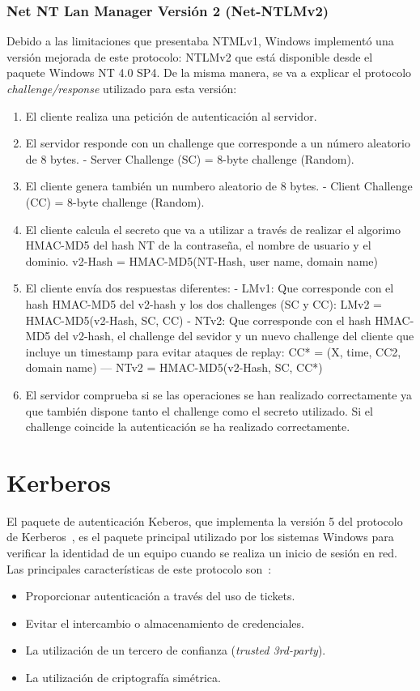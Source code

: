 \subsubsection{Net NT Lan Manager Versión 2 (Net-NTLMv2)}

Debido a las limitaciones que presentaba NTMLv1, Windows implementó una versión mejorada de este protocolo: NTLMv2 que está disponible desde el paquete Windows NT 4.0 SP4. De la misma manera, se va a explicar el protocolo {\it challenge/response} utilizado para esta versión:

\begin{enumerate}
\item El cliente realiza una petición de autenticación al servidor. 
\item El servidor responde con un challenge que corresponde a un número aleatorio de 8 bytes.
\subitem - Server Challenge (SC) = 8-byte challenge (Random).
\item El cliente genera también un numbero aleatorio de 8 bytes.
\subitem - Client Challenge (CC) = 8-byte challenge (Random).
\item El cliente calcula el secreto que va a utilizar a través de realizar el algorimo HMAC-MD5 del hash NT de la contraseña, el nombre de usuario y el dominio. 
\subitem v2-Hash = HMAC-MD5(NT-Hash, user name, domain name)
\item El cliente envía dos respuestas diferentes: 
\subitem - LMv1: Que corresponde con el hash HMAC-MD5 del v2-hash y los dos challenges (SC y CC): LMv2 = HMAC-MD5(v2-Hash, SC, CC)
\subitem - NTv2: Que corresponde con el hash HMAC-MD5 del v2-hash, el challenge del sevidor y un nuevo challenge del cliente que incluye un timestamp para evitar ataques de replay: CC* = (X, time, CC2, domain name) --- NTv2 = HMAC-MD5(v2-Hash, SC, CC*)
\item El servidor comprueba si se las operaciones se han realizado correctamente ya que también dispone tanto el challenge como el secreto utilizado. Si el challenge coincide la autenticación se ha realizado correctamente.
\end{enumerate}

\section{Kerberos}

El paquete de autenticación Keberos, que implementa la versión 5 del protocolo de Kerberos~\cite{Capitulo3:Kerberos}, es el paquete principal utilizado por los sistemas Windows para verificar la identidad de un equipo cuando se realiza un inicio de sesión en red. Las principales características de este protocolo son~\cite{Capitulo3:Kerberos2}: 
\begin{itemize}
\item Proporcionar autenticación a través del uso de tickets.
\item Evitar el intercambio o almacenamiento de credenciales. 
\item La utilización de un tercero de confianza ({\it trusted 3rd-party}).
\item La utilización de criptografía simétrica. 
\end{itemize}

